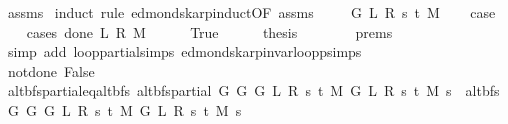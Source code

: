 \begin{isabellebody}
\isamarkupfalse%
\ assms\isanewline
{}\isamarkupfalse%
\ {\isacharparenleft}{\kern0pt}induct\ rule{\isacharcolon}{\kern0pt}\ edmonds{\isacharunderscore}{\kern0pt}karp{\isacharunderscore}{\kern0pt}induct{\isacharbrackleft}{\kern0pt}OF\ assms{\isacharbrackright}{\kern0pt}{\isacharparenright}{\kern0pt}\isanewline
\ \ \isamarkupfalse%
\ {\isacharparenleft}{\kern0pt}{}\ G\ L\ R\ s\ t\ M{\isacharparenright}{\kern0pt}\isanewline
\ \ \isamarkupfalse%
\ {\isacharquery}{\kern0pt}case\isanewline
\ \ \isamarkupfalse%
\ {\isacharparenleft}{\kern0pt}cases\ {\isachardoublequoteopen}done{\isacharunderscore}{\kern0pt}{}\ L\ R\ M{\isachardoublequoteclose}{\isacharparenright}{\kern0pt}\isanewline
\ \ \ \ \isamarkupfalse%
\ True\isanewline
\ \ \ \ \isamarkupfalse%
\ {\isacharquery}{\kern0pt}thesis\isanewline
\ \ \ \ \ \ \isamarkupfalse%
\ {\isachardoublequoteopen}{}{\isachardot}{\kern0pt}prems{\isachardoublequoteclose}\isanewline
\ \ \ \ \ \ \isamarkupfalse%
\ {\isacharparenleft}{\kern0pt}simp\ add{\isacharcolon}{\kern0pt}\ loop{\isacharprime}{\kern0pt}{\isacharunderscore}{\kern0pt}partial{\isachardot}{\kern0pt}simps\ edmonds{\isacharunderscore}{\kern0pt}karp{\isacharunderscore}{\kern0pt}invar{\isachardot}{\kern0pt}loop{\isacharprime}{\kern0pt}{\isacharunderscore}{\kern0pt}psimps{\isacharparenright}{\kern0pt}\isanewline
\ \ \isamarkupfalse%
\isanewline
\ \ \ \ \isamarkupfalse%
\ not{\isacharunderscore}{\kern0pt}done{\isacharunderscore}{\kern0pt}{}{\isacharcolon}{\kern0pt}\ False\isanewline
\ \ \ \ \isamarkupfalse%
\ alt{\isacharunderscore}{\kern0pt}bfs{\isacharunderscore}{\kern0pt}partial{\isacharunderscore}{\kern0pt}eq{\isacharunderscore}{\kern0pt}alt{\isacharunderscore}{\kern0pt}bfs{\isacharcolon}{\kern0pt}\ {\isachardoublequoteopen}alt{\isacharunderscore}{\kern0pt}bfs{\isacharunderscore}{\kern0pt}partial\ {\isacharparenleft}{\kern0pt}G{}\ G\ {\isacharparenleft}{\kern0pt}G{}\ L\ R\ s\ t\ M{\isacharparenright}{\kern0pt}{\isacharparenright}{\kern0pt}\ {\isacharparenleft}{\kern0pt}G{}\ L\ R\ s\ t\ M{\isacharparenright}{\kern0pt}\ s\ {\isacharequal}{\kern0pt}\ alt{\isacharunderscore}{\kern0pt}bfs\ {\isacharparenleft}{\kern0pt}G{}\ G\ {\isacharparenleft}{\kern0pt}G{}\ L\ R\ s\ t\ M{\isacharparenright}{\kern0pt}{\isacharparenright}{\kern0pt}\ {\isacharparenleft}{\kern0pt}G{}\ L\ R\ s\ t\ M{\isacharparenright}{\kern0pt}\ s{\isachardoublequoteclose}\isanewline

\end{isabellebody}
